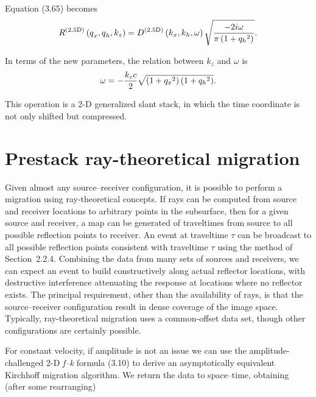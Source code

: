 Equation (3.65) becomes
\begin{equation}\text{\textit{$R$}}^{(2.5\text{D})}\left(\text{\textit{$q$}}_{\text{\textit{$x$}}},\text{\textit{$q$}}_{\text{\textit{$h$}}},\text{\textit{$k_z$}}\right)
=\text{\textit{$D$}}^{(2.5\text{D})}\left(\text{\textit{$k$}}_{\text{\textit{$x$}}},\text{\textit{$k$}}_{\text{\textit{$h$}}},\omega \right) \sqrt{\frac{-2
i \omega }{\pi \left(1+\text{\textit{$q_h$}}{}^2\right)}} .\end{equation}

In terms of the new parameters, the relation between \(k_z\) and $\omega $ is
\begin{equation}\omega =-\text{\textit{$\frac{\text{\textit{$k_z$}}c}{2}$}}\sqrt{\left(1+\text{\textit{$q_x$}}{}^2\right)\left(1+\text{\textit{$q_h$}}{}^2\right)}.\end{equation}

This operation is a 2-D generalized slant stack, in which the time coordinate is not only shifted but compressed.

\section{Prestack ray-theoretical migration}

Given almost any source--receiver configuration, it is possible to perform a migration using ray-theoretical concepts. If rays can be computed
from source and receiver locations to arbitrary points in the subsurface, then for a given source and receiver, a map can be generated of traveltimes
from source to all possible reflection points to receiver. An event at traveltime $\tau $ can be broadcast to
all possible reflection points consistent with traveltime $\tau$ using the method of \nobreak Section~2.2.4. \nobreak Combining the data from many sets of sources and receivers, we can expect an
event to build constructively along actual reflector locations, with destructive interference attenuating the response at locations where no reflector
exists. The principal requirement, other than the availability of rays, is that the source--receiver configuration result in dense coverage of
the image space. Typically, ray-theoretical migration uses a common-offset data set, though other configurations are certainly possible.

For constant velocity, if amplitude is not an issue we can use the amplitude-challenged 2-D \textit{f--k} formula (3.10) to derive an asymptotically
equivalent Kirchhoff migration algorithm. We return the data to space--time, obtaining (after some rearranging)


